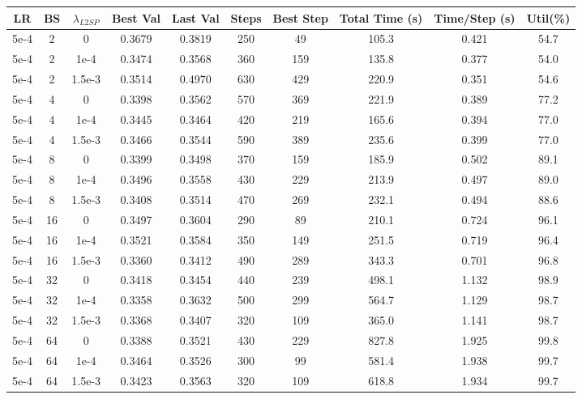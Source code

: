\begin{table}[p]
\centering
\scriptsize
\renewcommand{\arraystretch}{0.9}

\begin{adjustbox}{max width=\textwidth,max totalheight=\textheight}
\begin{tabular}{cccccccccc}
\hline
LR & BS & $\lambda_{L2SP}$ & Best Val & Last Val & Steps & Best Step & Total Time (s) & Time/Step (s) & Util(\%)\\
\hline
5e-4&2&0&0.3679&0.3819&250&49&105.3&0.421&54.7\\
5e-4&2&1e-4&0.3474&0.3568&360&159&135.8&0.377&54.0\\
5e-4&2&1.5e-3&0.3514&0.4970&630&429&220.9&0.351&54.6\\
5e-4&4&0&0.3398&0.3562&570&369&221.9&0.389&77.2\\
5e-4&4&1e-4&0.3445&0.3464&420&219&165.6&0.394&77.0\\
5e-4&4&1.5e-3&0.3466&0.3544&590&389&235.6&0.399&77.0\\
5e-4&8&0&0.3399&0.3498&370&159&185.9&0.502&89.1\\
5e-4&8&1e-4&0.3496&0.3558&430&229&213.9&0.497&89.0\\
5e-4&8&1.5e-3&0.3408&0.3514&470&269&232.1&0.494&88.6\\
5e-4&16&0&0.3497&0.3604&290&89&210.1&0.724&96.1\\
5e-4&16&1e-4&0.3521&0.3584&350&149&251.5&0.719&96.4\\
5e-4&16&1.5e-3&0.3360&0.3412&490&289&343.3&0.701&96.8\\
5e-4&32&0&0.3418&0.3454&440&239&498.1&1.132&98.9\\
5e-4&32&1e-4&0.3358&0.3632&500&299&564.7&1.129&98.7\\
5e-4&32&1.5e-3&0.3368&0.3407&320&109&365.0&1.141&98.7\\
5e-4&64&0&0.3388&0.3521&430&229&827.8&1.925&99.8\\
5e-4&64&1e-4&0.3464&0.3526&300&99&581.4&1.938&99.7\\
5e-4&64&1.5e-3&0.3423&0.3563&320&109&618.8&1.934&99.7\\


\end{tabular}
\end{adjustbox}
\end{table}
